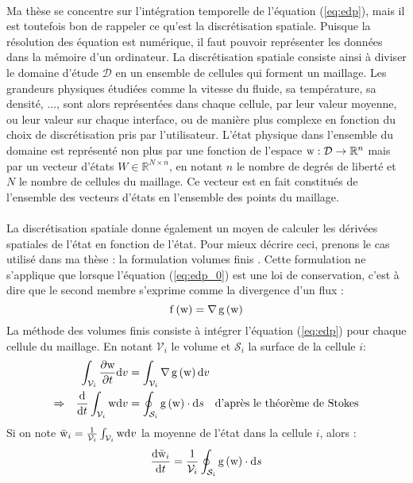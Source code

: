 		\paragraph{}
		Ma thèse se concentre sur l'intégration temporelle de l'équation (\ref{eq:edp}), mais il est toutefois bon de rappeler ce qu'est la discrétisation spatiale.
		Puisque la résolution des équation est numérique, il faut pouvoir représenter les données dans la mémoire d'un ordinateur.
		La discrétisation spatiale consiste ainsi à diviser le domaine d'étude $\mathcal{D}$ en un ensemble de cellules qui forment un maillage.
		Les grandeurs physiques étudiées comme la vitesse du fluide, sa température, sa densité, ..., sont alors représentées dans chaque cellule, par leur valeur moyenne, ou leur valeur sur chaque interface, ou de manière plus complexe en fonction du choix de discrétisation pris par l'utilisateur.
		L'état physique dans l'ensemble du domaine est représenté non plus par une fonction de l'espace $\textup{w} : \mathcal{D} \rightarrow \mathbb{R}^n$ mais par un vecteur d'états $W \in \mathbb{R}^{N\times n}$, en notant $n$ le nombre de degrés de liberté et $N$ le nombre de cellules du maillage.
		Ce vecteur est en fait constitués de l'ensemble des vecteurs d'états en l'ensemble des points du maillage.

		\paragraph{}
		La discrétisation spatiale donne également un moyen de calculer les dérivées spatiales de l'état en fonction de l'état.
		Pour mieux décrire ceci, prenons le cas utilisé dans ma thèse : la formulation volumes finis \cite{EymardGallouetHerbin2000}.
		Cette formulation ne s'applique que lorsque l'équation (\ref{eq:edp_0}) est une loi de conservation, c'est à dire que le second membre s'exprime comme la divergence d'un flux :
		$$\operatorname{f}\left(\textup{w}\right) = \nabla\operatorname{g}\left(\textup{w}\right)$$
		La méthode des volumes finis consiste à intégrer l'équation (\ref{eq:edp}) pour chaque cellule du maillage.
		En notant $\mathcal{V}_i$ le volume et $\mathcal{S}_i$ la surface de la cellule $i$:
		\begin{align*}
			&&\int_{\mathcal{V}_i}\frac{\partial\textup{w}}{\partial t}\mathrm{d}v &= \int_{\mathcal{V}_i}\nabla\operatorname{g}\left(\textup{w}\right)\mathrm{d}v \\
			\Rightarrow&&\frac{\mathrm{d}}{\mathrm{d}t}\int_{\mathcal{V}_i}\textup{w}\mathrm{d}v &= \oint_{\mathcal{S}_i}\operatorname{g}\left(\textup{w}\right)\cdot\mathrm{d}s\quad\textrm{d'après le théorème de Stokes}
		\end{align*}
		Si on note $\bar{\textup{w}}_i = \frac{1}{\mathcal{V}_i}\int_{\mathcal{V}_i}\textup{w}\mathrm{d}v$ la moyenne de l'état dans la cellule $i$, alors :
		$$\frac{\mathrm{d}\bar{\textup{w}}_i}{\mathrm{d}t} = \frac{1}{\mathcal{V}_i}\oint_{\mathcal{S}_i}\operatorname{g}\left(\textup{w}\right)\cdot\mathrm{d}s$$

